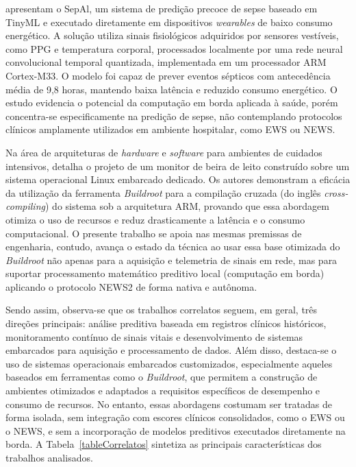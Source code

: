  apresentam o SepAl, um sistema de predição precoce de sepse baseado em TinyML e executado diretamente em dispositivos \textit{wearables} de baixo consumo energético. A solução utiliza sinais fisiológicos adquiridos por sensores vestíveis, como PPG e temperatura corporal, processados localmente por uma rede neural convolucional temporal quantizada, implementada em um processador ARM Cortex-M33. O modelo foi capaz de prever eventos sépticos com antecedência média de 9,8 horas, mantendo baixa latência e reduzido consumo energético. O estudo evidencia o potencial da computação em borda aplicada à saúde, porém concentra-se especificamente na predição de sepse, não contemplando protocolos clínicos amplamente utilizados em ambiente hospitalar, como EWS ou NEWS.

Na área de arquiteturas de \textit{hardware} e \textit{software} para ambientes de cuidados intensivos,  detalha o projeto de um monitor de beira de leito construído sobre um sistema operacional Linux embarcado dedicado. Os autores demonstram a eficácia da utilização da ferramenta \textit{Buildroot} para a compilação cruzada (do inglês \textit{cross-compiling}) do sistema sob a arquitetura ARM, provando que essa abordagem otimiza o uso de recursos e reduz drasticamente a latência e o consumo computacional. O presente trabalho se apoia nas mesmas premissas de engenharia, contudo, avança o estado da técnica ao usar essa base otimizada do \textit{Buildroot} não apenas para a aquisição e telemetria de sinais em rede, mas para suportar processamento matemático preditivo local (computação em borda) aplicando o protocolo NEWS2 de forma nativa e autônoma.

Sendo assim, observa-se que os trabalhos correlatos seguem, em geral, três direções principais: análise preditiva baseada em registros clínicos históricos, monitoramento contínuo de sinais vitais e desenvolvimento de sistemas embarcados para aquisição e processamento de dados. Além disso, destaca-se o uso de sistemas operacionais embarcados customizados, especialmente aqueles baseados em ferramentas como o \textit{Buildroot}, que permitem a construção de ambientes otimizados e adaptados a requisitos específicos de desempenho e consumo de recursos. No entanto, essas abordagens costumam ser tratadas de forma isolada, sem integração com escores clínicos consolidados, como o EWS ou o NEWS, e sem a incorporação de modelos preditivos executados diretamente na borda. A Tabela~\ref{tableCorrelatos} sintetiza as principais características dos trabalhos analisados.

